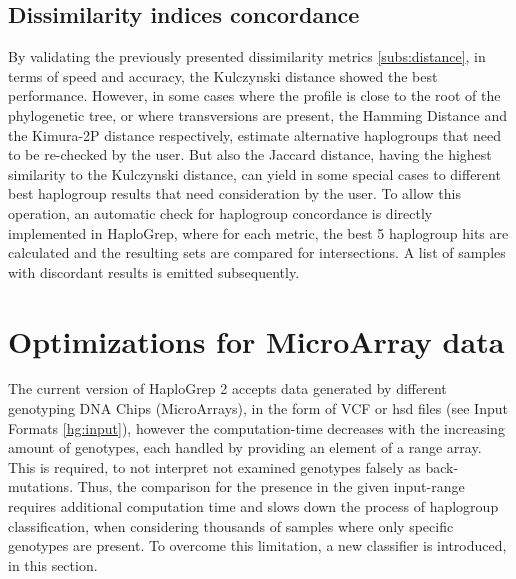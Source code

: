 \subsection{Dissimilarity indices concordance }
By validating the previously presented dissimilarity metrics \ref{subs:distance}, in terms of speed and accuracy, the Kulczynski distance showed the best performance. However, in some cases where the profile is close to the root of the phylogenetic tree, or where transversions are present, the Hamming Distance and the Kimura-2P distance respectively, estimate alternative haplogroups that need to be re-checked by the user. But also the Jaccard distance, having the highest similarity to the Kulczynski distance, can yield in some special cases to different best haplogroup results that need consideration by the user. To allow this operation, an automatic check for haplogroup concordance is directly implemented in HaploGrep, where for each metric, the best 5 haplogroup hits are calculated and the resulting sets are compared for intersections. A list of samples with discordant results is emitted subsequently. 

\section{Optimizations for MicroArray data}\label{hg:optimization}
The current version of HaploGrep 2 accepts data generated by different genotyping DNA Chips (MicroArrays), in the form of VCF or hsd files (see Input Formats \ref{hg:input}), however the computation-time decreases with the increasing amount of genotypes, each handled by providing an element of a range array. This is required, to not interpret not examined genotypes falsely as back-mutations. Thus, the comparison for the presence in the given input-range requires additional computation time and slows down the process of haplogroup classification, when considering thousands of samples where only specific genotypes are present. To overcome this limitation, a new classifier is introduced, in this section. 
